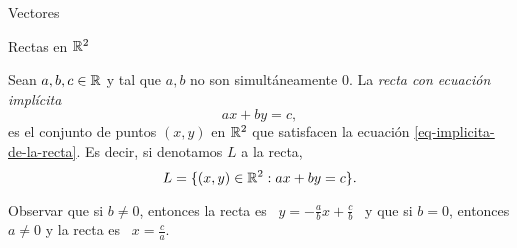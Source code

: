 \begin{chapter}{Vectores}
\begin{section}{Rectas en $\mathbb R^2$}
    \begin{definicion} Sean  $a,b,c \in \mathbb R$ y tal que $a,b$ no son simultáneamente $0$. La \textit{recta con ecuación implícita} 
    \begin{equation}\label{eq-implicita-de-la-recta}
        ax +by =c,
    \end{equation}
    es el conjunto de puntos $(x,y)$ en $\mathbb R^2$ que satisfacen la ecuación \eqref{eq-implicita-de-la-recta}.  Es decir, si denotamos $L$  a la recta,
    \begin{equation*}
        L = \{ (x,y)\in \mathbb R^2: ax +by =c\}.
    \end{equation*}
    \end{definicion}


    Observar  que si $b\ne0$, entonces la recta es \, $y= -\displaystyle\frac{a}{b}x + \displaystyle\frac{c}{b}$ \, y que si $b=0$,  entonces $a\ne 0$ y la recta es \, $x =\displaystyle\frac{c}{a}$.
    

\end{section}
\end{chapter}
